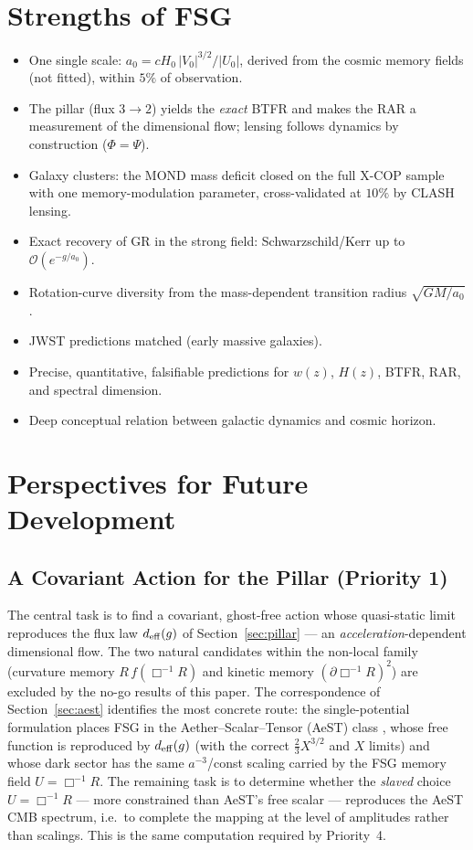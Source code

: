 \documentclass[11pt,a4paper]{article}
\begin{document}
\begin{onehalfspacing}
\section{Strengths of FSG}
\begin{itemize}
    \item One single scale: $a_0 = cH_0\,|V_0|^{3/2}/|U_0|$, derived from the cosmic memory fields (not fitted), within $5\%$ of observation.
    \item The pillar (flux $3\to2$) yields the \emph{exact} BTFR and makes the RAR a measurement of the dimensional flow; lensing follows dynamics by construction ($\Phi=\Psi$).
    \item Galaxy clusters: the MOND mass deficit closed on the full X-COP sample with one memory-modulation parameter, cross-validated at $10\%$ by CLASH lensing.
    \item Exact recovery of GR in the strong field: Schwarzschild/Kerr up to $\mathcal{O}(e^{-g/a_0})$.
    \item Rotation-curve diversity from the mass-dependent transition radius $\sqrt{GM/a_0}$.
    \item JWST predictions matched (early massive galaxies).
    \item Precise, quantitative, falsifiable predictions for $w(z)$, $H(z)$,
          BTFR, RAR, and spectral dimension.
    \item Deep conceptual relation between galactic dynamics and cosmic horizon.
\end{itemize}
\section{Perspectives for Future Development}
\label{sec:future}
\subsection{A Covariant Action for the Pillar (Priority 1)}
The central task is to find a covariant, ghost-free action whose quasi-static limit reproduces the flux law $d_{\rm eff}(g)$ of Section~\ref{sec:pillar} --- an \emph{acceleration}-dependent dimensional flow. The two natural candidates within the non-local family (curvature memory $R\,f(\Box^{-1}R)$ and kinetic memory $(\partial\Box^{-1}R)^2$) are excluded by the no-go results of this paper. The correspondence of Section~\ref{sec:aest} identifies the most concrete route: the single-potential formulation places FSG in the Aether--Scalar--Tensor (AeST) class \cite{SkordisZlosnik2021}, whose free function is reproduced by $d_{\rm eff}(g)$ (with the correct $\tfrac23 X^{3/2}$ and $X$ limits) and whose dark sector has the same $a^{-3}$/const scaling carried by the FSG memory field $U=\Box^{-1}R$. The remaining task is to determine whether the \emph{slaved} choice $U=\Box^{-1}R$ --- more constrained than AeST's free scalar --- reproduces the AeST CMB spectrum, i.e.\ to complete the mapping at the level of amplitudes rather than scalings. This is the same computation required by Priority~4.

\end{onehalfspacing}
\end{document}
